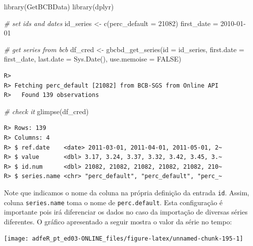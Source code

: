 \documentclass[
  11pt,
]{book}
\newenvironment{Shaded}{\begin{snugshade}}{\end{snugshade}}
\newcommand{\AttributeTok}[1]{\textcolor[rgb]{0.61,0.61,0.61}{#1}}
\newcommand{\CommentTok}[1]{\textcolor[rgb]{0.37,0.37,0.37}{\textit{#1}}}
\newcommand{\ConstantTok}[1]{\textcolor[rgb]{0,0,0}{#1}}
\newcommand{\DecValTok}[1]{\textcolor[rgb]{0.06,0.06,0.06}{#1}}
\newcommand{\FunctionTok}[1]{\textcolor[rgb]{0,0,0}{#1}}
\newcommand{\NormalTok}[1]{#1}
\newcommand{\OtherTok}[1]{\textcolor[rgb]{0.37,0.37,0.37}{#1}}
\newcommand{\StringTok}[1]{\textcolor[rgb]{0.5,0.5,0.5}{#1}}
\begin{document}
\begin{Shaded}
\begin{Highlighting}[]
\FunctionTok{library}\NormalTok{(GetBCBData)}
\FunctionTok{library}\NormalTok{(dplyr)}

\CommentTok{\# set ids and dates}
\NormalTok{id\_series }\OtherTok{\textless{}{-}} \FunctionTok{c}\NormalTok{(}\AttributeTok{perc\_default =} \DecValTok{21082}\NormalTok{)}
\NormalTok{first\_date }\OtherTok{=} \StringTok{\textquotesingle{}2010{-}01{-}01\textquotesingle{}}

\CommentTok{\# get series from bcb}
\NormalTok{df\_cred }\OtherTok{\textless{}{-}} \FunctionTok{gbcbd\_get\_series}\NormalTok{(}\AttributeTok{id =}\NormalTok{ id\_series,}
                            \AttributeTok{first.date =}\NormalTok{ first\_date,}
                            \AttributeTok{last.date =} \FunctionTok{Sys.Date}\NormalTok{(), }
                            \AttributeTok{use.memoise =} \ConstantTok{FALSE}\NormalTok{)}
\end{Highlighting}
\end{Shaded}

\begin{verbatim}
R> 
R> Fetching perc_default [21082] from BCB-SGS from Online API 
R>   Found 139 observations
\end{verbatim}

\begin{Shaded}
\begin{Highlighting}[]
\CommentTok{\# check it}
\FunctionTok{glimpse}\NormalTok{(df\_cred)}
\end{Highlighting}
\end{Shaded}

\begin{verbatim}
R> Rows: 139
R> Columns: 4
R> $ ref.date    <date> 2011-03-01, 2011-04-01, 2011-05-01, 2~
R> $ value       <dbl> 3.17, 3.24, 3.37, 3.32, 3.42, 3.45, 3.~
R> $ id.num      <dbl> 21082, 21082, 21082, 21082, 21082, 210~
R> $ series.name <chr> "perc_default", "perc_default", "perc_~
\end{verbatim}

Note que indicamos o nome da coluna na própria definição da entrada \texttt{id}. Assim, coluna \texttt{series.name} toma o nome de \texttt{perc.default}. Esta configuração é importante pois irá diferenciar os dados no caso da importação de diversas séries diferentes. O gráfico apresentado a seguir mostra o valor da série no tempo:

\begin{center}\texttt{[image: adfeR\_pt\_ed03-ONLINE\_files/figure-latex/unnamed-chunk-195-1]} \end{center}
\end{document}

